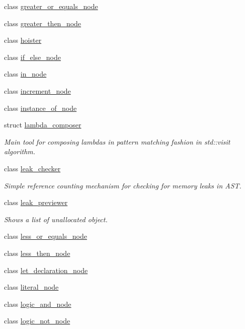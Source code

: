 \begin{DoxyCompactItemize}
\item 
class \hyperlink{classjawe_1_1greater__or__equals__node}{greater\+\_\+or\+\_\+equals\+\_\+node}
\item 
class \hyperlink{classjawe_1_1greater__then__node}{greater\+\_\+then\+\_\+node}
\item 
class \hyperlink{classjawe_1_1hoister}{hoister}
\item 
class \hyperlink{classjawe_1_1if__else__node}{if\+\_\+else\+\_\+node}
\item 
class \hyperlink{classjawe_1_1in__node}{in\+\_\+node}
\item 
class \hyperlink{classjawe_1_1increment__node}{increment\+\_\+node}
\item 
class \hyperlink{classjawe_1_1instance__of__node}{instance\+\_\+of\+\_\+node}
\item 
struct \hyperlink{structjawe_1_1lambda__composer}{lambda\+\_\+composer}
\begin{DoxyCompactList}\small\item\em Main tool for composing lambdas in pattern matching fashion in std\+::visit algorithm. \end{DoxyCompactList}\item 
class \hyperlink{classjawe_1_1leak__checker}{leak\+\_\+checker}
\begin{DoxyCompactList}\small\item\em Simple reference counting mechanism for checking for memory leaks in A\+ST. \end{DoxyCompactList}\item 
class \hyperlink{classjawe_1_1leak__previewer}{leak\+\_\+previewer}
\begin{DoxyCompactList}\small\item\em Shows a list of unallocated object. \end{DoxyCompactList}\item 
class \hyperlink{classjawe_1_1less__or__equals__node}{less\+\_\+or\+\_\+equals\+\_\+node}
\item 
class \hyperlink{classjawe_1_1less__then__node}{less\+\_\+then\+\_\+node}
\item 
class \hyperlink{classjawe_1_1let__declaration__node}{let\+\_\+declaration\+\_\+node}
\item 
class \hyperlink{classjawe_1_1literal__node}{literal\+\_\+node}
\item 
class \hyperlink{classjawe_1_1logic__and__node}{logic\+\_\+and\+\_\+node}
\item 
class \hyperlink{classjawe_1_1logic__not__node}{logic\+\_\+not\+\_\+node}

\end{DoxyCompactItemize}
